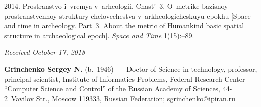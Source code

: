 \begin{multicols}{2}
{{\begin{thebibliography}{99}
\vspace*{1pt}

 2014. Prostranstvo i~vremya 
v~arheologii. Chast'~3. O~metrike bazisnoy prostranstvennoy struktury 
chelovechestva v~arkheologicheskuyu epokhu [Space and time in archeology. 
Part~3. About the metric of Humankind basic spatial structure  in  
archaeological epoch]. \textit{Space and Time}  
1(15):--89.
\end{thebibliography}

 }
 }

\end{multicols}

\vspace*{-6pt}

\hfill{\small\textit{Received October 17, 2018}}




  
  \Contrl
  
  \noindent
   \textbf{Grinchenko Sergey N.} (b.\ 1946)~--- Doctor of Science in technology, professor, principal 
scientist, Institute of Informatics Problems, Federal Research Center ``Computer Science and 
Control'' of the Russian Academy of Sciences, 44-2~Vavilov Str., Moscow 119333, Russian 
Federation; \mbox{sgrinchenko@ipiran.ru}
\label{end\stat}

\renewcommand{\bibname}{\protect\rm Литература}  